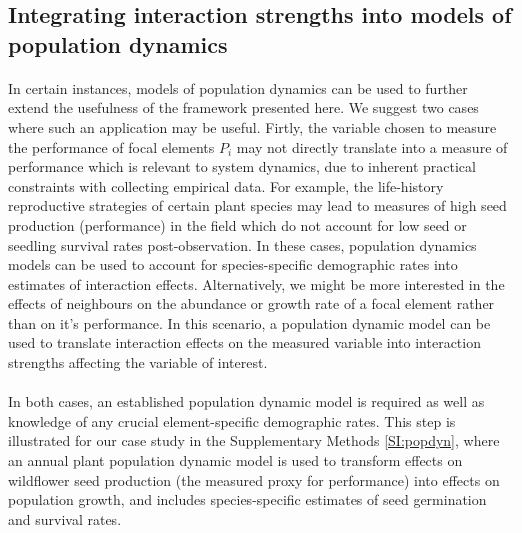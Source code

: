 \documentclass[a4,12pt]{article}
\begin{document}
    \subsection{Integrating interaction strengths into models of population dynamics}

        \paragraph{}
        In certain instances, models of population dynamics can be used to further extend the usefulness of the framework presented here. We suggest two cases where such an application may be useful. Firtly, the variable chosen to measure the performance of focal elements $P_i$ may not directly translate into a measure of performance which is relevant to system dynamics,  due to inherent practical constraints with collecting empirical data. For example, the life-history reproductive strategies of certain plant species may lead to measures of high seed production (performance) in the field which do not account for low seed or seedling survival rates post-observation. In these cases, population dynamics models can be used to account for species-specific demographic rates into estimates of interaction effects. Alternatively, we might be more interested in the effects of neighbours on the abundance or growth rate of a focal element rather than on it's performance. In this scenario, a population dynamic model can be used to translate interaction effects on the measured variable into interaction strengths affecting the variable of interest. 

        \paragraph{}
        In both cases, an established population dynamic model is required as well as knowledge of any crucial element-specific demographic rates. This step is illustrated for our case study in the Supplementary Methods \ref{SI:popdyn}, where an annual plant population dynamic model is used to transform effects on wildflower seed production (the measured proxy for performance) into effects on population growth, and includes species-specific estimates of seed germination and survival rates. 

\end{document}
